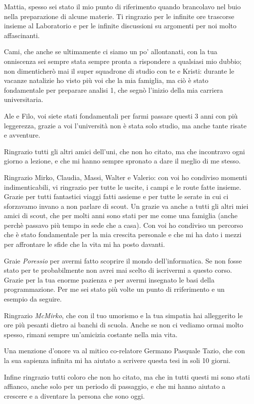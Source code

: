     Mattia, spesso sei stato il mio punto di riferimento quando brancolavo nel buio nella preparazione di alcune materie. Ti ringrazio per le infinite ore trascorse insieme al Laboratorio e per le infinite discussioni su argomenti per noi molto affascinanti.
    
    Cami, che anche se ultimamente ci siamo un po' allontanati, con la tua onniscenza sei sempre stata sempre pronta a rispondere a qualsiasi mio dubbio; non dimenticherò mai il super squadrone di studio con te e Kristi: durante le vacanze natalizie ho visto più voi che la mia famiglia, ma ciò è stato fondamentale per preparare analisi 1, che segnò l'inizio della mia carriera universitaria.

    Ale e Filo, voi siete stati fondamentali per farmi passare questi 3 anni con più leggerezza, grazie a voi l'università non è stata solo studio, ma anche tante risate e avventure.

    Ringrazio tutti gli altri amici dell'uni, che non ho citato, ma che incontravo ogni giorno a lezione, e che mi hanno sempre spronato a dare il meglio di me stesso.

Ringrazio Mirko, Claudia, Massi, Walter e Valerio: con voi ho condiviso momenti indimenticabili, vi ringrazio per tutte le uscite, i campi e le route fatte insieme. Grazie per tutti fantastici viaggi fatti assieme e per tutte le serate in cui ci sforzavamo invano a non parlare di scout.
Un grazie va anche a tutti gli altri miei amici di scout, che per molti anni sono stati per me come una famiglia (anche perchè passavo più tempo in sede che a casa). Con voi ho condiviso un percorso che è stato fondamentale per la mia crescita personale e che mi ha dato i mezzi per affrontare le sfide che la vita mi ha posto davanti.

Graie \textit{Poressio} per avermi fatto scoprire il mondo dell'informatica. Se non fosse stato per te probabilmente non avrei mai scelto di iscrivermi a questo corso. Grazie per la tua enorme pazienza e per avermi insegnato le basi della programmazione. Per me sei stato più volte un punto di rriferimento e un esempio da seguire.

Ringrazio \textit{McMirko}, che con il tuo umorismo e la tua simpatia hai alleggerito le ore più pesanti dietro ai banchi di scuola. Anche se non ci vediamo ormai molto spesso, rimani sempre un'amicizia costante nella mia vita.

Una menzione d'onore va al mitico co-relatore Germano Pasquale Tazio, che con la sua sapienza infinita mi ha aiutato a scrivere questa tesi in soli 10 giorni.

Infine ringrazio tutti coloro che non ho citato, ma che in tutti questi mi sono stati affianco, anche solo per un periodo di passaggio, e che mi hanno aiutato a crescere e a diventare la persona che sono oggi.